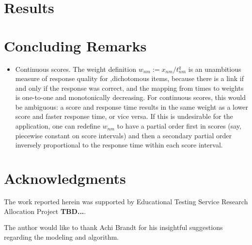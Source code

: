 \documentclass{article}
\begin{document}
\section{Results}
\label{results}

\section{Concluding Remarks}
\label{remarks}

\begin{itemize}
	\item {Continuous scores.} The weight definition $w_{nm} := x_{nm}/t_{nm}^q$ is an unambitious measure of response quality for ,dichotomous items, because there is a link if and only if the response was correct, and the mapping from times to weights is one-to-one and monotonically decreasing. For continuous scores, this would be ambiguous: a score and response time results in the same weight as a lower score and faster response time, or vice versa. If this is undesirable for the application, one can redefine $w_{nm}$ to have a partial order first in scores (say, piecewise constant on score intervals) and then a secondary partial order inversely proportional to the response time within each score interval.
\end{itemize}

\section{Acknowledgments}
The work reported herein was supported by Educational Testing Service Research Allocation Project {\bf TBD...}.

The author would like to thank Achi Brandt for his insightful suggestions regarding the modeling and algorithm.



\end{document}
